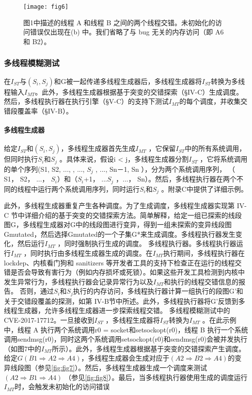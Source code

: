 \begin{figure}[ht]
    \centering
    \texttt{[image: fig6]}
    \caption{\label{fig:fig6}图1中描述的线程 A 和线程 B 之间的两个线程交错。未初始化的访问错误仅出现在(b) 中。我们省略了与 bug 无关的内存访问（即 A6 和 B2）。}
\end{figure}

\subsubsection{多线程模糊测试}

在$I_{ST}$与$(S_i, S_j)$和G被一起传递多线程生成器后，多线程生成器将$I_{ST}$转换为多线程输入$I_{MT}$。此外，多线程生成器根据基于突变的交错探索（§IV-C）生成调度。然后，多线程执行器在执行引擎（§V-C）的支持下测试$I_{MT}$的每个调度，并收集交错段覆盖率（§IV-B）。
    
\paragraph{多线程生成器}给定$I_{ST}$和$(S_i, S_j)$，多线程生成器首先生成$I_{MT}$ ，它保留$I_{ST}$中的所有系统调用，但同时执行$S_i$和$S_j$ 。具体来说，假设i < j，多线程生成器分割$I_{ST}$ ，它将系统调用的单个序列(S1, S2, ..., , ..., $S_j$ , ..., Sn－1, Sn ），分为两个系统调用序列， （ S1， S2， ...， $S_i$）和（$S_i$+1， ...$S_j$ ，...， Sn）。然后，多线程执行器在两个不同的线程中运行两个系统调用序列，同时运行$S_i$和$S_j$ 。附录C中提供了详细示例。

此外，多线程生成器重复产生各种调度。为了生成调度，多线程生成器实现第 IV-C 节中详细介绍的基于突变的交错探索方法。简单解释，给定一组已探索的线段图G，多线程生成器对G中的线段图进行变异，得到一组未探索的变异线段图Gmutated，然后选择Gmutated的一个子集G*来生成调度。多线程执行器发生变化，然后运行$I_{MT}$ ，同时强制执行生成的调度。
多线程执行器。多线程执行器运行$I_{MT}$ ，同时执行由多线程生成器生成的调度。在$I_{MT}$执行期间，多线程执行器在 lockdep、内核看门狗和 sanitizers 等开发者工具的支持下检查正在运行的线程交错是否会导致有害行为（例如内存损坏或死锁）。如果这些开发工具检测到内核中发生异常行为，多线程执行器会记录异常行为以及$I_{MT}$和执行的线程交错信息的报告。
否则，通过$S_i$和$S_j$执行的内存访问，多线程执行器计算一组执行的段图G’和关于交错段覆盖的探测，如第 IV-B节中所述。此外，多线程执行器将G’反馈到多线程生成器，允许多线程生成器进一步探索线程交错。
多线程模糊测试中的 CVE-2017-17712。一旦接收到$I_{ST}$ ，多线程生成器将$I_{ST}$转换为$I_{MT}$ 。在此示例中，线程 A 执行两个系统调用r0 = socket和setsockopt(r0)，线程 B 执行一个系统调用sendmsg(r0)，同时这两个系统调用setsockopt(r0)和sendmsg(r0)会被并发执行（如图7中的$I_{MT}$所示）。此外，多线程生成器根据基于突变的交错探索产生调度。给定$G(B1 \Rightarrow A2 \Rightarrow A4)$，多线程生成器会生成对应于$(A2 \Rightarrow B2 \Rightarrow A4)$的变异线段图（参见\autoref{fig:fig7}）。然后，多线程生成器生成一个调度来测试$(A2\Rightarrow B1\Rightarrow A4)$ （参见\autoref{fig:fig8}）。最后，当多线程执行器使用生成的调度运行$I_{MT}$时，会触发未初始化的访问错误

